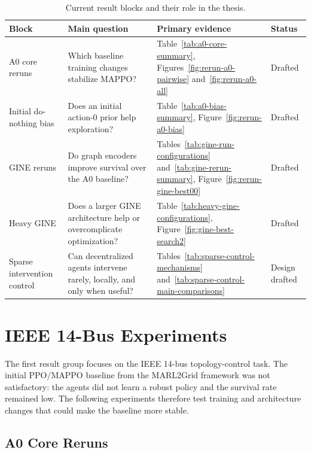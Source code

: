 \begin{table}[H]
  \centering
  \small
  \caption{Current result blocks and their role in the thesis.}
  \label{tab:experiment-index}
  \setlength{\tabcolsep}{4pt}
  \begin{tabular}{L{0.17\textwidth}L{0.34\textwidth}L{0.32\textwidth}L{0.10\textwidth}}
    \toprule
    Block & Main question & Primary evidence & Status \\
    \midrule
    A0 core reruns & Which baseline training changes stabilize MAPPO? &
    Table~\ref{tab:a0-core-summary}, Figures~\ref{fig:rerun-a0-pairwise}
    and~\ref{fig:rerun-a0-all} & Drafted \\
    Initial do-nothing bias & Does an initial action-0 prior help exploration? &
    Table~\ref{tab:a0-bias-summary}, Figure~\ref{fig:rerun-a0-bias} & Drafted \\
    GINE reruns & Do graph encoders improve survival over the A0 baseline? &
    Tables~\ref{tab:gine-run-configurations} and~\ref{tab:gine-rerun-summary},
    Figure~\ref{fig:rerun-gine-best00} & Drafted \\
    Heavy GINE & Does a larger GINE architecture help or overcomplicate
    optimization? & Table~\ref{tab:heavy-gine-configurations},
    Figure~\ref{fig:gine-best-search2} & Drafted \\
    Sparse intervention control & Can decentralized agents intervene rarely,
    locally, and only when useful? &
    Tables~\ref{tab:sparse-control-mechanisms}
    and~\ref{tab:sparse-control-main-comparisons} & Design drafted \\
    \bottomrule
  \end{tabular}
\end{table}

\section{IEEE 14-Bus Experiments}
\label{sec:bus14-results}

The first result group focuses on the IEEE 14-bus topology-control task. The
initial PPO/MAPPO baseline from the MARL2Grid framework was not satisfactory:
the agents did not learn a robust policy and the survival rate remained low.
The following experiments therefore test training and architecture changes that
could make the baseline more stable.

\subsection{A0 Core Reruns}
\label{subsec:a0-core-reruns}

